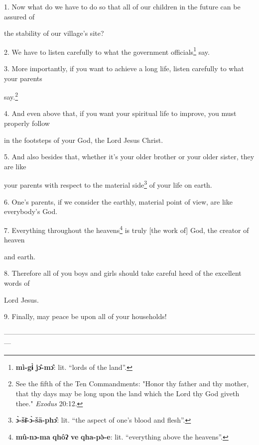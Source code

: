 \setcounter{footnote}{0}

1. Now what do we have to do so that all of our children in the future can be assured
of

the stability of our village's site?

2. We have to listen carefully to what the government officials\footnote{\textbf{mì-gɨ̀} \textbf{jɔ̂-mɔ̂}: lit. ``lords of the land''.} say.

3. More importantly, if you want to achieve a long life, listen carefully to what
your parents

say.\footnote{See the fifth of the Ten Commandments: "Honor thy father and thy mother, that thy days may be long upon the land which the Lord thy God giveth thee." \textit{Exodus} 20:12.}

4. And even above that, if you want your spiritual life to improve, you must properly
follow

in the footsteps of your God, the Lord Jesus Christ.

5. And also besides that, whether it's your older brother or your older sister,
they are like

your parents with respect to the material side\footnote{\textbf{ɔ̀-šɨ̄-ɔ̀-šā-phɔ̂}: lit. ``the aspect of one's blood and flesh''.} of your life on earth.

6. One's parents, if we consider the earthly, material point of view, are like
everybody's God.

7. Everything throughout the heavens\footnote{\textbf{mû-nɔ-ma} \textbf{qhôʔ} \textbf{ve} \textbf{qha-pə̀-e}: lit. ``everything above the heavens''.} is truly [the work of] God, the creator
of heaven

and earth.

8. Therefore all of you boys and girls should take careful heed of the excellent
words of

Lord Jesus.

9. Finally, may peace be upon all of your households!

---------------------------------------------------------------------------------------------------------------

